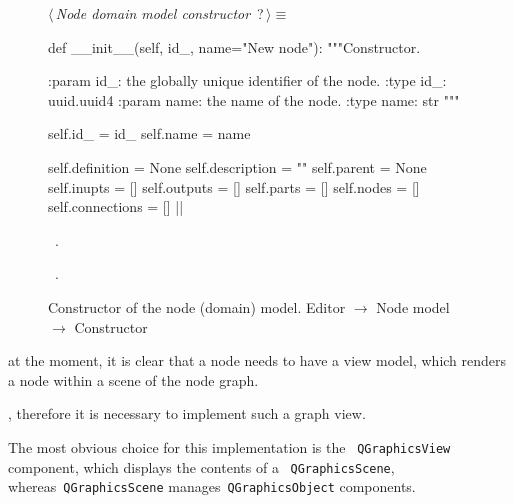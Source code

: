 \documentclass[%
    a4paper,    %
    justified,  %
    nobib,      %
    openany     %
]{tufte-book}
\begin{document}
\begin{figure}
\begin{flushleft} \small
\begin{minipage}{\linewidth}\label{scrap67}\raggedright\small
{} $\langle\,${\itshape Node domain model constructor}\nobreak\ {\footnotesize {?}}$\,\rangle\equiv$
\vspace{-1ex}
\begin{pythoncode}
def __init__(self, id_, name="New node"):
    """Constructor.

    :param id_: the globally unique identifier of the node.
    :type  id_: uuid.uuid4
    :param name: the name of the node.
    :type  name: str
    """

    self.id_   = id_
    self.name = name

    self.definition = None
    self.description = ""
    self.parent = None
    self.inupts = []
    self.outputs = []
    self.parts = []
    self.nodes = []
    self.connections = []
|\NWsep|
\end{pythoncode}
\vspace{1.5ex}
\footnotesize
\begin{list}{}{\setlength{\itemsep}{-\parsep}\setlength{\itemindent}{-\leftmargin}}
\item \NWtxtMacroDefBy\ .
\item \NWtxtMacroRefIn\ .

\item{}
\end{list}
\end{minipage}\vspace{4ex}
\end{flushleft}
\caption{Constructor of the node (domain) model.
  \newline{}\newline{}Editor $\rightarrow$ Node model $\rightarrow$ Constructor}
\label{editor:lst:node-domain-model:constructor}
\end{figure}

 at the moment, it is
clear that a node needs to have a view model, which renders a node within a
scene of the node graph.

, therefore it is
necessary to implement such a graph view.

The most obvious choice for this implementation is the ~\verb=QGraphicsView=
component, which displays the contents of a ~\verb=QGraphicsScene=,
whereas~\verb=QGraphicsScene= manages~\verb=QGraphicsObject= components.
\end{document}
